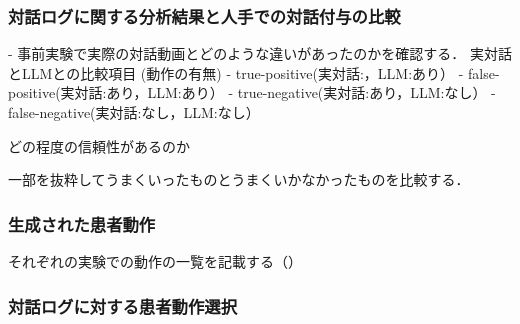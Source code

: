 \subsubsection*{対話ログに関する分析結果と人手での対話付与の比較}
- 事前実験で実際の対話動画とどのような違いがあったのかを確認する．
実対話とLLMとの比較項目  (動作の有無)
- true-positive(実対話:，LLM:あり）
- false-positive(実対話:あり，LLM:あり）
- true-negative(実対話:あり，LLM:なし）
- false-negative(実対話:なし，LLM:なし）

どの程度の信頼性があるのか

一部を抜粋してうまくいったものとうまくいかなかったものを比較する．

\subsubsection*{生成された患者動作}
それぞれの実験での動作の一覧を記載する（）


\subsubsection*{対話ログに対する患者動作選択}
